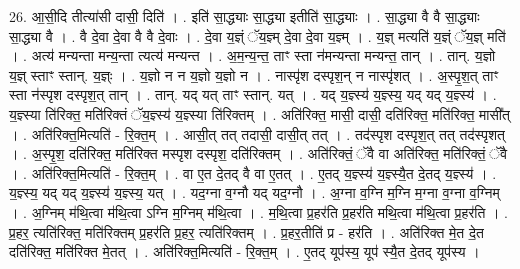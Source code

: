 \documentclass[17pt]{extarticle}
\begin{document}
26. आ॒सी॒दि तीत्या॑सी दासी॒ दिति॑ । . इति॑ सा॒द्ध्याः सा॒द्ध्या इतीति॑ सा॒द्ध्याः । . सा॒द्ध्या वै वै सा॒द्ध्याः सा॒द्ध्या वै । . वै दे॒वा दे॒वा वै वै दे॒वाः । . दे॒वा य॒ज्ञ्ं ॅय॒ज्ञ्म् दे॒वा दे॒वा य॒ज्ञ्म् । . य॒ज्ञ् मत्यति॑ य॒ज्ञ्ं ॅय॒ज्ञ् मति॑ । . अत्य॑ मन्यन्ता मन्य॒न्ता त्यत्य॑ मन्यन्त । . अ॒म॒न्य॒न्त॒ ताꣳ स्ता न॑मन्यन्ता मन्यन्त॒ तान् । . तान्. य॒ज्ञो य॒ज्ञ् स्ताꣳ स्तान्. य॒ज्ञ्ः । . य॒ज्ञो न न य॒ज्ञो य॒ज्ञो न । . नास्पृ॑श दस्पृश॒न् न नास्पृ॑शत् । . अ॒स्पृ॒श॒त् ताꣳ स्ता न॑स्पृश दस्पृश॒त् तान् । . तान्. यद् यत् ताꣳ स्तान्. यत् । . यद् य॒ज्ञ्स्य॑ य॒ज्ञ्स्य॒ यद् यद् य॒ज्ञ्स्य॑ । . य॒ज्ञ्स्या ति॑रिक्त॒ मति॑रिक्तं ॅय॒ज्ञ्स्य॑ य॒ज्ञ्स्या ति॑रिक्तम् । . अति॑रिक्त॒ मासी॒ दासी॒ दति॑रिक्त॒ मति॑रिक्त॒ मासी᳚त् । . अति॑रिक्त॒मित्यति॑ - रि॒क्त॒म् । . आसी॒त् तत् तदासी॒ दासी॒त् तत् । . तद॑स्पृश दस्पृश॒त् तत् तद॑स्पृशत् । . अ॒स्पृ॒श॒ दति॑रिक्त॒ मति॑रिक्त मस्पृश दस्पृश॒ दति॑रिक्तम् । . अति॑रिक्तं॒ ॅवै वा अति॑रिक्त॒ मति॑रिक्तं॒ ॅवै । . अति॑रिक्त॒मित्यति॑ - रि॒क्त॒म् । . वा ए॒त दे॒तद् वै वा ए॒तत् । . ए॒तद् य॒ज्ञ्स्य॑ य॒ज्ञ्स्यै॒त दे॒तद् य॒ज्ञ्स्य॑ । . य॒ज्ञ्स्य॒ यद् यद् य॒ज्ञ्स्य॑ य॒ज्ञ्स्य॒ यत् । . यद॒ग्ना व॒ग्नौ यद् यद॒ग्नौ । . अ॒ग्ना व॒ग्नि म॒ग्नि म॒ग्ना व॒ग्ना व॒ग्निम् । . अ॒ग्निम् म॑थि॒त्वा म॑थि॒त्वा ऽग्नि म॒ग्निम् म॑थि॒त्वा । . म॒थि॒त्वा प्र॒हर॑ति प्र॒हर॑ति मथि॒त्वा म॑थि॒त्वा प्र॒हर॑ति । . प्र॒हर॒ त्यति॑रिक्त॒ मति॑रिक्तम् प्र॒हर॑ति प्र॒हर॒ त्यति॑रिक्तम् । . प्र॒हर॒तीति॑ प्र - हर॑ति । . अति॑रिक्त मे॒त दे॒त दति॑रिक्त॒ मति॑रिक्त मे॒तत् । . अति॑रिक्त॒मित्यति॑ - रि॒क्त॒म् । . ए॒तद् यूप॑स्य॒ यूप॑ स्यै॒त दे॒तद् यूप॑स्य । \newline
\end{document}
